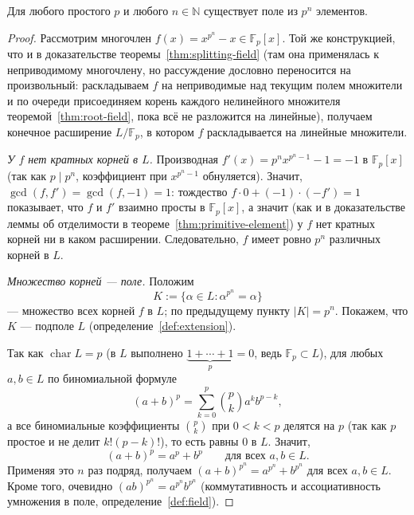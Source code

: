 \documentclass[12pt]{article}
\begin{document}
    \begin{theorem}\label{thm:finite-field-existence}
    	Для любого простого $p$ и любого $n \in \mathbb{N}$ существует поле из $p^n$ элементов.
    \end{theorem}
    \begin{proof}
    	Рассмотрим многочлен $f(x) = x^{p^n} - x \in \mathbb{F}_p[x]$. Той же конструкцией, что и в доказательстве теоремы~\ref{thm:splitting-field} (там она применялась к неприводимому многочлену, но рассуждение дословно переносится на произвольный: раскладываем $f$ на неприводимые над текущим полем множители и по очереди присоединяем корень каждого нелинейного множителя теоремой~\ref{thm:root-field}, пока всё не разложится на линейные), получаем конечное расширение $L/\mathbb{F}_p$, в котором $f$ раскладывается на линейные множители.
    
    	\emph{У $f$ нет кратных корней в $L$.} Производная $f'(x) = p^n x^{p^n-1} - 1 = -1$ в $\mathbb{F}_p[x]$ (так как $p \mid p^n$, коэффициент при $x^{p^n-1}$ обнуляется). Значит, $\gcd(f,f')=\gcd(f,-1)=1$: тождество $f\cdot 0 + (-1)\cdot(-f') = 1$ показывает, что $f$ и $f'$ взаимно просты в $\mathbb{F}_p[x]$, а значит (как и в доказательстве леммы об отделимости в теореме~\ref{thm:primitive-element}) у $f$ нет кратных корней ни в каком расширении. Следовательно, $f$ имеет ровно $p^n$ различных корней в $L$.
    
    	\emph{Множество корней --- поле.} Положим
    	\[
    	K := \{\alpha \in L : \alpha^{p^n} = \alpha\}
    	\]
    	--- множество всех корней $f$ в $L$; по предыдущему пункту $|K|=p^n$. Покажем, что $K$ --- подполе $L$ (определение~\ref{def:extension}).
    
    	Так как $\operatorname{char} L = p$ (в $L$ выполнено $\underbrace{1+\cdots+1}_{p}=0$, ведь $\mathbb{F}_p \subset L$), для любых $a,b \in L$ по биномиальной формуле
    	\[
    	(a+b)^p = \sum_{k=0}^{p} \binom{p}{k} a^k b^{p-k},
    	\]
    	а все биномиальные коэффициенты $\binom{p}{k}$ при $0<k<p$ делятся на $p$ (так как $p$ простое и не делит $k!(p-k)!$), то есть равны $0$ в $L$. Значит,
    	\[
    	(a+b)^p = a^p+b^p \qquad \text{для всех } a,b \in L.
    	\]
    	Применяя это $n$ раз подряд, получаем $(a+b)^{p^n} = a^{p^n}+b^{p^n}$ для всех $a,b \in L$. Кроме того, очевидно $(ab)^{p^n}=a^{p^n}b^{p^n}$ (коммутативность и ассоциативность умножения в поле, определение~\ref{def:field}).
    

\end{proof}
\end{document}

